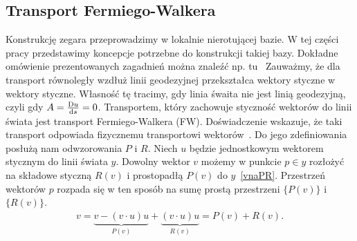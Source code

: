 \subsection{Transport Fermiego-Walkera}
Konstrukcję zegara przeprowadzimy w lokalnie nierotującej bazie. W tej części
pracy przedstawimy koncepcje potrzebne do konstrukcji takiej bazy. Dokładne 
omówienie prezentowanych zagadnień można znaleźć np. 
tu~\cite{synge1960, FWframesconstruct}
Zauważmy, że dla transport równoległy wzdłuż linii geodezyjnej
przekształca wektory styczne w wektory styczne. Własność tę 
tracimy, gdy linia śwaita nie jest linią geodezyjną, czyli
gdy $A = \frac{\text{D} u}{\text{d} s} = 0$. Transportem, który zachowuje styczność 
wektorów do linii świata jest transport Fermiego-Walkera (FW).
Doświadczenie wskazuje, że taki transport odpowiada 
fizycznemu transportowi wektorów~\cite{Costa2015, Ashtekar20141}.
Do jego zdefiniowania posłużą nam odwzorowania $P$ i $R$.
Niech $u$ będzie jednostkowym
wektorem stycznym do linii świata $y$. Dowolny wektor $v$ możemy w punkcie 
$p\in y$ rozłożyć na składowe styczną $R(v)$ i prostopadłą $P(v)$ 
do $y$~\eqref{vnaPR}. Przestrzeń wektorów $p$ rozpada się w ten sposób 
na sumę prostą przestrzeni $\{P(v)\}$ i $\{R(v)\}$.
\begin{align}\label{vnaPR}
v = \underbrace{v - (v\cdot u) u}_{P(v)} + 
\underbrace{(v\cdot u)u}_{R(v)} = P(v) + R(v).
\end{align}

